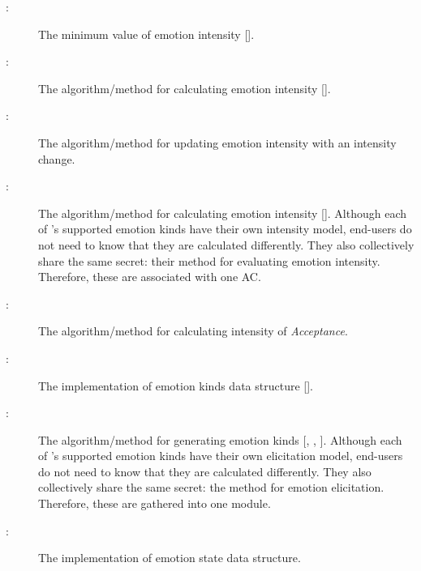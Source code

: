 \begin{description}

    \item[ \actheacnum \label{acEmotionIntensityMin}:]
    The minimum value of emotion intensity [].

    \item[ \actheacnum \label{acIntensityAlgo}:] The
    algorithm/method for calculating emotion intensity
    [].

    \item[ \actheacnum \label{acUpdateIntensityAlgo}:]
    The algorithm/method for updating emotion intensity with an intensity
    change.

    \item[ \actheacnum \label{acIntensityEvalAlgo}:]
    The algorithm/method for calculating emotion intensity
    []. Although each of \progname{}'s supported emotion
    kinds have their own intensity model, end-users do not need to know that
    they are calculated differently. They also collectively share the same
    secret: their method for evaluating emotion intensity. Therefore, these are
    associated with one AC.

    \item[ \actheacnum \label{acElicitAcceptanceAlgo}:]
    The algorithm/method for calculating intensity of \textit{Acceptance}.

    \item[ \actheacnum \label{acEmotionKindType}:] The
    implementation of emotion kinds data structure [].

    \item[ \actheacnum \label{acAppraisalAlgo}:] The
    algorithm/method for generating emotion kinds [,
    , ]. Although each of
    \progname{}'s supported emotion kinds have their own elicitation model,
    end-users do not need to know that they are calculated differently. They
    also collectively share the same secret: the method for emotion
    elicitation. Therefore, these are gathered into one module.

    \item[ \actheacnum \label{acEmotionStateImpl}:] The
    implementation of emotion state data structure.


\end{description}

